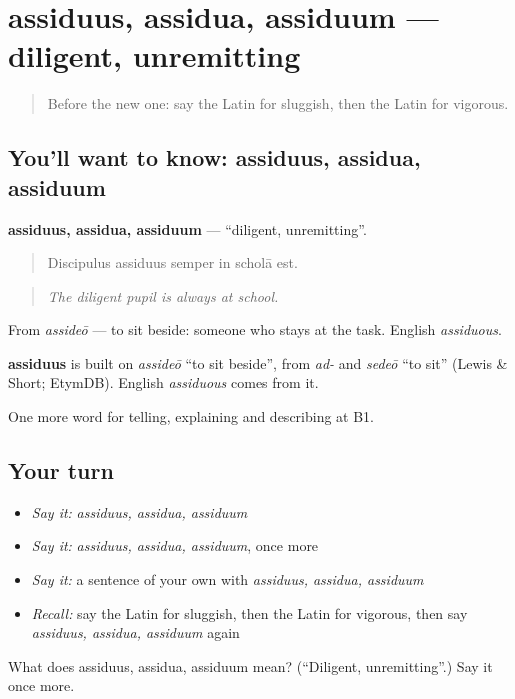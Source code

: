 \section[assiduus, assidua, assiduum]{assiduus, assidua, assiduum — diligent, unremitting}

\label{lesson:LA-C508-assiduus}



\begin{quote}
Before the new one: say the Latin for sluggish, then the Latin for vigorous.
\end{quote}

\subsection*{You'll want to know: assiduus, assidua, assiduum}
\textbf{assiduus, assidua, assiduum} — \textquotedblleft{}diligent, unremitting\textquotedblright{}.

\begin{quote}
Discipulus assiduus semper in scholā est.
\end{quote}

\begin{quote}
\emph{The diligent pupil is always at school.}
\end{quote}

From \emph{assideō} — to sit beside: someone who stays at the task. English \emph{assiduous}.

\begin{cousinweb}
\textbf{assiduus} is built on \emph{assideō} \textquotedblleft{}to sit beside\textquotedblright{}, from \emph{ad-} and \emph{sedeō} \textquotedblleft{}to sit\textquotedblright{} (Lewis \& Short; EtymDB). English \emph{assiduous} comes from it.
\end{cousinweb}

\begin{grammarlens}[title={What you've built}]
One more word for telling, explaining and describing at B1.
\end{grammarlens}

\subsection*{Your turn}
\begin{itemize}
\raggedright
  \item \emph{Say it:} \emph{assiduus, assidua, assiduum}
  \item \emph{Say it:} \emph{assiduus, assidua, assiduum}, once more
  \item \emph{Say it:} a sentence of your own with \emph{assiduus, assidua, assiduum}
  \item \emph{Recall:} say the Latin for sluggish, then the Latin for vigorous, then say \emph{assiduus, assidua, assiduum} again
\end{itemize}

\begin{tcolorbox}[breakable,colback=teal!4,colframe=teal!35!black,title={Before you move on}]
What does assiduus, assidua, assiduum mean? (\textquotedblleft{}Diligent, unremitting\textquotedblright{}.) Say it once more.
\end{tcolorbox}
